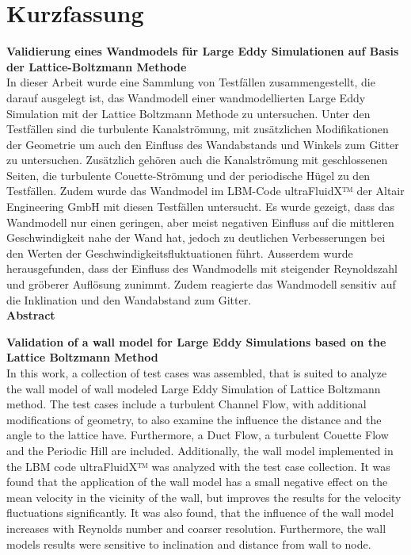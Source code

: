 \chapter*{Kurzfassung}
\thispagestyle{empty}
\vspace{0cm}

\textbf{\large Validierung eines Wandmodels für Large Eddy Simulationen auf Basis der Lattice-Boltzmann Methode}\\


In dieser Arbeit wurde eine Sammlung von Testfällen zusammengestellt, die darauf ausgelegt ist, das Wandmodell einer wandmodellierten Large Eddy Simulation mit der Lattice Boltzmann Methode zu untersuchen. Unter den Testfällen sind die turbulente Kanalströmung, mit zusätzlichen Modifikationen der Geometrie um auch den Einfluss des Wandabstands und Winkels zum Gitter zu untersuchen. Zusätzlich gehören auch die Kanalströmung mit geschlossenen Seiten, die turbulente Couette-Strömung und der periodische Hügel zu den Testfällen. Zudem wurde das Wandmodel im LBM-Code ultraFluidX™ der Altair Engineering GmbH mit diesen Testfällen untersucht. Es wurde gezeigt, dass das Wandmodell nur einen geringen, aber meist negativen Einfluss auf die mittleren Geschwindigkeit nahe der Wand hat, jedoch zu deutlichen Verbesserungen bei den Werten der Geschwindigkeitsfluktuationen führt. Ausserdem wurde herausgefunden, dass der Einfluss des Wandmodells mit steigender Reynoldszahl und gröberer Auflösung zunimmt. Zudem reagierte das Wandmodell sensitiv auf die Inklination und den Wandabstand zum Gitter.
\vspace{2cm}  \\
{\bfseries \sffamily \huge Abstract}
\vspace{1cm}

\textbf{\large Validation of a wall model for Large Eddy Simulations based on the Lattice Boltzmann Method}\\

In this work, a collection of test cases was assembled, that is suited to analyze the wall model of wall modeled Large Eddy Simulation of Lattice Boltzmann method. The test cases include a turbulent Channel Flow, with additional modifications of geometry, to also examine the influence the distance and the angle to the lattice have. Furthermore, a Duct Flow, a turbulent Couette Flow and the Periodic Hill are included. Additionally, the wall model implemented in the LBM code ultraFluidX™ was analyzed with the test case collection. It was found that the application of the wall model has a small negative effect on the mean velocity in the vicinity of the wall, but improves the results for the velocity fluctuations significantly. It was also found, that the influence of the wall model increases with Reynolds number and coarser resolution. Furthermore, the wall models results were sensitive to inclination and distance from wall to node.\\